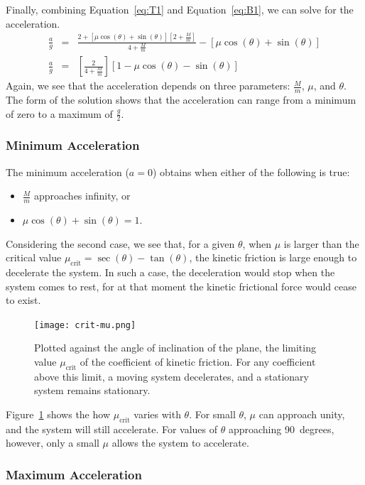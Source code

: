 \documentclass[twocolumn]{article}
\begin{document}
Finally, combining Equation~\ref{eq:T1} and Equation~\ref{eq:B1}, we can solve
for the acceleration.
\begin{eqnarray}
   \nonumber
   \tfrac{a}{g} &=& \frac{2 + [\mu \cos(\theta) + \sin(\theta)][2 +
                     \tfrac{M}{m}]}{4 + \tfrac{M}{m}} - [\mu \cos(\theta) +
                     \sin(\theta)]\\
   \tfrac{a}{g} &=& \left[ \frac{2}{4 + \tfrac{M}{m}} \right] [1 - \mu
                    \cos(\theta) - \sin(\theta)]
\end{eqnarray}
Again, we see that the acceleration depends on three parameters:
$\tfrac{M}{m}$, $\mu$, and $\theta$. The form of the solution shows that the
acceleration can range from a minimum of zero to a maximum of $\tfrac{g}{2}$.

\subsubsection{Minimum Acceleration}

The minimum acceleration ($a = 0$) obtains when either of the following is
true:
\begin{itemize}
   \item $\tfrac{M}{m}$ approaches infinity, or
   \item $\mu \cos(\theta) + \sin(\theta) = 1$.
\end{itemize}
Considering the second case, we see that, for a given $\theta$, when $\mu$ is
larger than the critical value $\mu_\text{crit} = \sec(\theta) - \tan(\theta)$,
the kinetic friction is large enough to decelerate the system. In such a case,
the deceleration would stop when the system comes to rest, for at that moment
the kinetic frictional force would cease to exist.
\begin{figure}
   \texttt{[image: crit-mu.png]}
   \caption{Plotted against the angle of inclination of the plane, the limiting
   value $\mu_\text{crit}$ of the coefficient of kinetic friction. For any
   coefficient above this limit, a moving system decelerates, and a stationary
   system remains stationary.}
   \label{fig:mu-crit}
\end{figure}
Figure~\ref{fig:mu-crit} shows the how $\mu_\text{crit}$ varies with $\theta$.
For small $\theta$, $\mu$ can approach unity, and the system will still
accelerate. For values of $\theta$ approaching 90~degrees, however, only a
small $\mu$ allows the system to accelerate.

\subsubsection{Maximum Acceleration}
\end{document}
